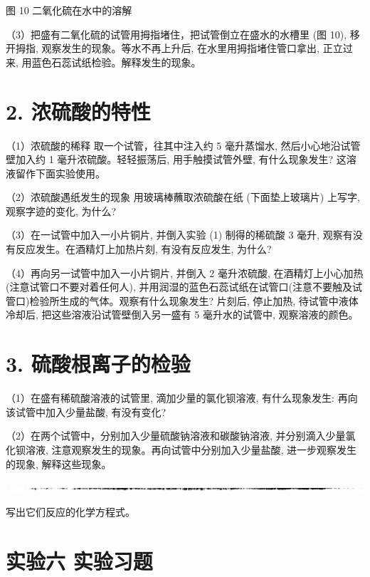 \documentclass[10pt]{article}
\begin{document}
图 10 二氧化硫在水中的溶解

（3）把盛有二氧化硫的试管用拇指堵住，把试管倒立在盛水的水槽里 (图 10), 移开拇指, 观察发生的现象。等水不再上升后, 在水里用拇指堵住管口拿出, 正立过来, 用蓝色石蕊试纸检验。解释发生的现象。

\section*{2. 浓硫酸的特性}

（1）浓硫酸的稀释 取一个试管，往其中注入约 5 毫升蒸馏水, 然后小心地沿试管壁加入约 1 毫升浓硫酸。轻轻振荡后, 用手触摸试管外壁, 有什么现象发生? 这溶液留作下面实验使用。

（2）浓硫酸遇纸发生的现象 用玻璃棒蘸取浓硫酸在纸 (下面垫上玻璃片) 上写字, 观察字迹的变化, 为什么?

（3）在一试管中加入一小片铜片, 并倒入实验 (1) 制得的稀硫酸 3 毫升, 观察有没有反应发生。在酒精灯上加热片刻, 有没有反应发生, 为什么?

（4）再向另一试管中加入一小片铜片, 并倒入 2 毫升浓硫酸, 在酒精灯上小心加热(注意试管口不要对着任何人), 并用润湿的蓝色石蕊试纸在试管口(注意不要触及试管口)检验所生成的气体。观察有什么现象发生? 片刻后, 停止加热, 待试管中液体冷却后, 把这些溶液沿试管壁倒入另一盛有 5 毫升水的试管中, 观察溶液的颜色。

\section*{3. 硫酸根离子的检验}

（1）在盛有稀硫酸溶液的试管里, 滴加少量的氯化钡溶液, 有什么现象发生: 再向该试管中加入少量盐酸, 有没有变化?

（2）在两个试管中，分别加入少量硫酸钠溶液和碳酸钠溶液, 并分别滴入少量氯化钡溶液, 注意观察发生的现象。再向试管中分别加入少量盐酸, 进一步观察发生的现象, 解释这些现象。

\begin{center}
\includegraphics[max width=1.0\textwidth]{images/01912d0f-097c-7e75-8f32-4f326cd86c9f_163_804807.jpg}
\end{center}

写出它们反应的化学方程式。

\section*{实验六 实验习题}
\end{document}

